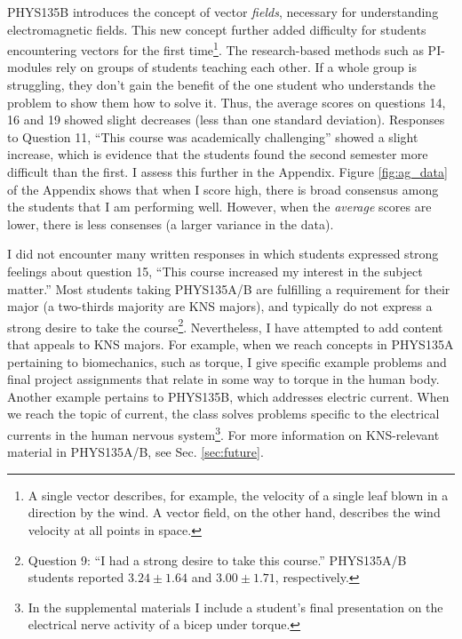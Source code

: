 \documentclass[../../main.tex]{subfiles}
\begin{document}
PHYS135B introduces the concept of vector \textit{fields}, necessary for understanding electromagnetic fields.  This new concept further added difficulty for students encountering vectors for the first time\footnote{A single vector describes, for example, the velocity of a single leaf blown in a direction by the wind.  A vector field, on the other hand, describes the wind velocity at all points in space.}.  The research-based methods such as PI-modules rely on groups of students teaching each other.  If a whole group is struggling, they don't gain the benefit of the one student who understands the problem to show them how to solve it.  Thus, the average scores on questions 14, 16 and 19 showed slight decreases (less than one standard deviation).  Responses to Question 11, ``This course was academically challenging'' showed a slight increase, which is evidence that the students found the second semester more difficult than the first.  I assess this further in the Appendix.  Figure \ref{fig:ag_data} of the Appendix shows that when I score high, there is broad consensus among the students that I am performing well.  However, when the \textit{average} scores are lower, there is less consenses (a larger variance in the data).  \\ \hspace{0.1cm}

I did not encounter many written responses in which students expressed strong feelings about question 15, ``This course increased my interest in the subject matter.''  Most students taking PHYS135A/B are fulfilling a requirement for their major (a two-thirds majority are KNS majors), and typically do not express a strong desire to take the course\footnote{Question 9: ``I had a strong desire to take this course.'' PHYS135A/B students reported $3.24\pm 1.64$ and $3.00\pm 1.71$, respectively.}.  Nevertheless, I have attempted to add content that appeals to KNS majors.  For example, when we reach concepts in PHYS135A pertaining to biomechanics, such as torque, I give specific example problems and final project assignments that relate in some way to torque in the human body.  Another example pertains to PHYS135B, which addresses electric current.  When we reach the topic of current, the class solves problems specific to the electrical currents in the human nervous system\footnote{In the supplemental materials I include a student's final presentation on the electrical nerve activity of a bicep under torque.}.  For more information on KNS-relevant material in PHYS135A/B, see Sec. \ref{sec:future}. \\ \hspace{0.1cm}
\end{document}

